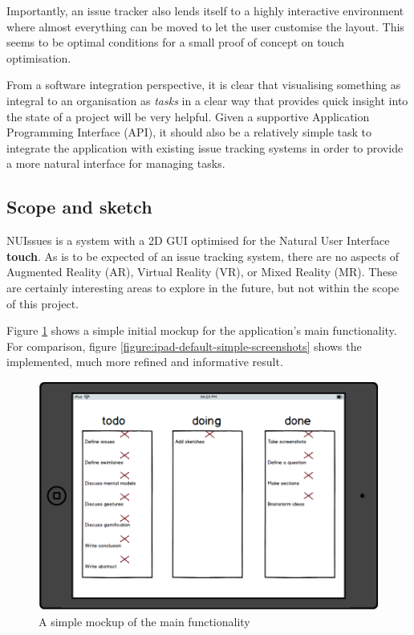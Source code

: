 Importantly, an issue tracker also lends itself to a highly interactive environment where almost everything can be moved to let the user customise the layout. This seems to be optimal conditions for a small proof of concept on touch optimisation.

From a software integration perspective, it is clear that visualising something as integral to an organisation as \textit{tasks} in a clear way that provides quick insight into the state of a project will be very helpful. Given a supportive Application Programming Interface (API), it should also be a relatively simple task to integrate the application with existing issue tracking systems in order to provide a more natural interface for managing tasks.

\subsection{Scope and sketch}

NUIssues is a system with a 2D GUI optimised for the Natural User Interface \textbf{touch}. As is to be expected of an issue tracking system, there are no aspects of Augmented Reality (AR), Virtual Reality (VR), or Mixed Reality (MR). These are certainly interesting areas to explore in the future, but not within the scope of this project.

Figure \ref{figure:ipad-mockup} shows a simple initial mockup for the application's main functionality. For comparison, figure \ref{figure:ipad-default-simple-screenshots} shows the implemented, much more refined and informative result.

\begin{figure}[H]
    \centerline{\includegraphics[scale=0.4]{images/mockup}}
    \caption{A simple mockup of the main functionality}   
    \label{figure:ipad-mockup}
\end{figure}

